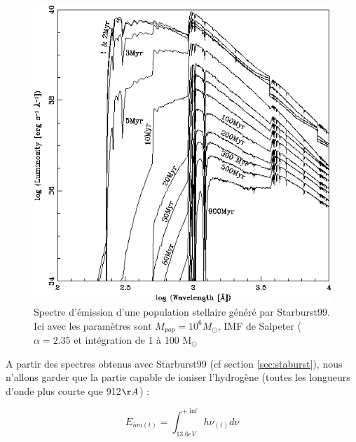 \begin{figure}
        \includegraphics[width=.95\linewidth]{img/03/spectre_starburst.jpg} 
        \caption[Spectres Starburst99]{Spectre d'émission d'une population stellaire généré par Starburst99.
        Ici avec les paramètres sont $M_{pop}=10^6 M_\odot$, \ac{IMF} de Salpeter ($\alpha=2.35$ et intégration de 1 à 100 M$_\odot$ 
 		\label{fig:spectre_starburst}}
\end{figure}




A partir des spectres obtenus avec Starburst99 (cf section \ref{sec:staburst}), nous n'allons garder que la partie capable de ioniser l'hydrogène (toutes les longueurs d'onde plus courte que 912$\AA$) :

\begin{equation}
E_{ion (t)} = \int_{13.6eV}^{+\inf} h \nu_{(t)} d\nu
\end{equation}

